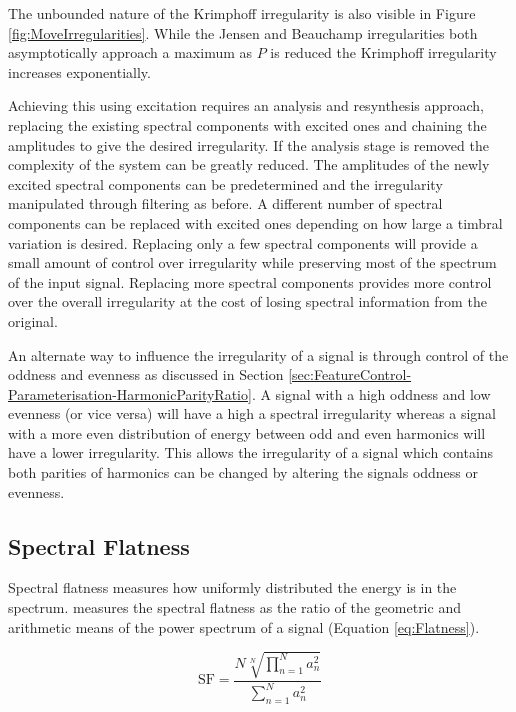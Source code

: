 			The unbounded nature of the Krimphoff irregularity is also visible in Figure
			\ref{fig:MoveIrregularities}. While the Jensen and Beauchamp irregularities both asymptotically
			approach a maximum as $P$ is reduced the Krimphoff irregularity increases exponentially.

			Achieving this using excitation requires an analysis and resynthesis approach, replacing the
			existing spectral components with excited ones and chaining the amplitudes to give the desired
			irregularity.  If the analysis stage is removed the complexity of the system can be greatly
			reduced. The amplitudes of the newly excited spectral components can be predetermined and the
			irregularity manipulated through filtering as before. A different number of spectral components can
			be replaced with excited ones depending on how large a timbral variation is desired. Replacing only
			a few spectral components will provide a small amount of control over irregularity while preserving
			most of the spectrum of the input signal. Replacing more spectral components provides more control
			over the overall irregularity at the cost of losing spectral information from the original.

			An alternate way to influence the irregularity of a signal is through control of the oddness and
			evenness as discussed in Section \ref{sec:FeatureControl-Parameterisation-HarmonicParityRatio}. A
			signal with a high oddness and low evenness (or vice versa) will have a high a spectral
			irregularity whereas a signal with a more even distribution of energy between odd and even
			harmonics will have a lower irregularity. This allows the irregularity of a signal which contains
			both parities of harmonics can be changed by altering the signals oddness or evenness.

	\subsection{Spectral Flatness}
	\label{sec:FeatureControl-Parameterisation-Flatness}
		Spectral flatness measures how uniformly distributed the energy is in the spectrum.
		\citet{johnston1988transform} measures the spectral flatness as the ratio of the geometric and arithmetic
		means of the power spectrum of a signal (Equation \ref{eq:Flatness}).

		\begin{equation}
			\textrm{SF} = \frac{N\sqrt[N]{\prod_{n = 1}^{N} a_{n}^{2}}}
				           {\sum_{n = 1}^{N} a_{n}^{2}}
			\label{eq:Flatness}
		\end{equation}

